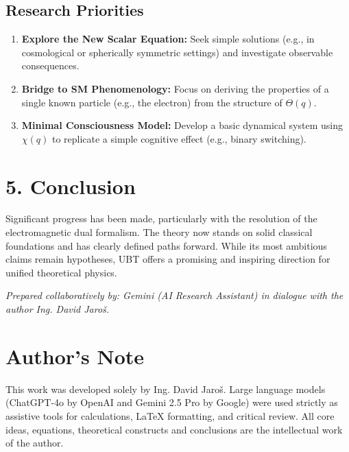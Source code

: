 \documentclass[12pt]{article}
\begin{document}
\subsection*{Research Priorities}

\begin{enumerate}
  \item \textbf{Explore the New Scalar Equation:} Seek simple solutions (e.g., in cosmological or spherically symmetric settings) and investigate observable consequences.
  \item \textbf{Bridge to SM Phenomenology:} Focus on deriving the properties of a single known particle (e.g., the electron) from the structure of \( \Theta(q) \).
  \item \textbf{Minimal Consciousness Model:} Develop a basic dynamical system using \( \chi(q) \) to replicate a simple cognitive effect (e.g., binary switching).
\end{enumerate}

\section*{5. Conclusion}

Significant progress has been made, particularly with the resolution of the electromagnetic dual formalism. The theory now stands on solid classical foundations and has clearly defined paths forward. While its most ambitious claims remain hypotheses, UBT offers a promising and inspiring direction for unified theoretical physics.

\vspace{1em}
\noindent
\textit{Prepared collaboratively by: Gemini (AI Research Assistant) in dialogue with the author Ing. David Jaroš.}

\section*{Author's Note}

This work was developed solely by Ing. David Jaroš.  
Large language models (ChatGPT-4o by OpenAI and Gemini 2.5 Pro by Google) were used strictly as assistive tools for calculations, LaTeX formatting, and critical review.  
All core ideas, equations, theoretical constructs and conclusions are the intellectual work of the author.
\end{document}
